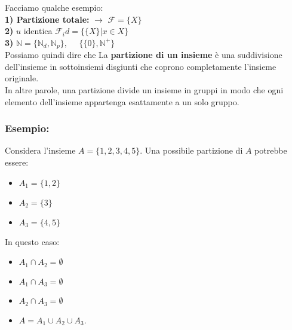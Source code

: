 \documentclass[article,12pt]{book}
\begin{document}
\begin{enumerate}
{\begin{center}
\end{center}
Facciamo qualche esempio: \\
\textbf{1) Partizione totale:} $\rightarrow$ $\mathcal{F} = \{X\}$ \\
\textbf{2)} $u$ identica $\mathcal{F}_id = \{\{X\} | x \in X\}$ \\
\textbf{3)} $\mathbb{N} = \{\mathbb{N}_d, \mathbb{N}_p\}, \ \ \ \ \ \ \{\{0\}, \mathbb{N}^+\}$ \\[1EX]

Possiamo quindi dire che La \textbf{partizione di un insieme} è una suddivisione dell'insieme in sottoinsiemi disgiunti che coprono completamente l'insieme originale.\\ 
In altre parole, una partizione divide un insieme in gruppi in modo che ogni elemento dell'insieme appartenga esattamente a un solo gruppo.
\newpage

\subsubsection{Esempio:}
Considera l'insieme $A = \{1, 2, 3, 4, 5\}$. Una possibile partizione di $A$ potrebbe essere:
\begin{itemize}
    \item $A_1 = \{1, 2\}$
    \item $A_2 = \{3\}$
    \item $A_3 = \{4, 5\}$
\end{itemize}

In questo caso:
\begin{itemize}
    \item $A_1 \cap A_2 = \emptyset$
    \item $A_1 \cap A_3 = \emptyset$
    \item $A_2 \cap A_3 = \emptyset$
    \item $A = A_1 \cup A_2 \cup A_3$.
\end{itemize}

}
\end{enumerate}
\end{document}
